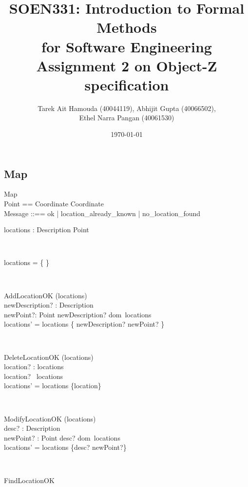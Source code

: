 \documentclass[12pt]{article}
\title{SOEN331: Introduction to Formal Methods\\for Software Engineering\\
Assignment 2 on Object-Z specification}
\author{Tarek Ait Hamouda (40044119), Abhijit Gupta (40066502),\\ 
Ethel Narra Pangan (40061530)}
\date{\today}
\begin{document}
\begin{spacing}{1.5}

\maketitle

\newpage

\section{Map}

\begin{class}{Map}
 \\
Point == Coordinate \times Coordinate \\
Message ::== ok | location\_already\_known | no\_location\_found \\
\begin{state}
locations : Description \pfun Point\\
\end{state} \\
\begin{init}
locations = \{ \}
\end{init} \\
\begin{op}{AddLocationOK}
\Delta (locations) \\
newDescription? : Description\\
newPoint?: Point 
\ST
newDescription? \notin dom~locations \\
locations' = locations \cup \{ newDescription? \to newPoint? \}
\end{op}\\
\begin{op}{DeleteLocationOK}
\Delta (locations) \\
location? : locations\\
\ST
location? \in ~locations\\
locations' = locations \setminus \{location\}
\end{op}\\
\begin{op}{ModifyLocationOK}
\Delta (locations) \\
desc? : Description\\
newPoint? : Point
\ST
desc? \in dom~locations \\
locations' = locations \oplus \{desc? \to newPoint?\}
\end{op}\\ 
\begin{op}{FindLocationOK}

\end{op}
\end{class}
\end{spacing}
\end{document}
